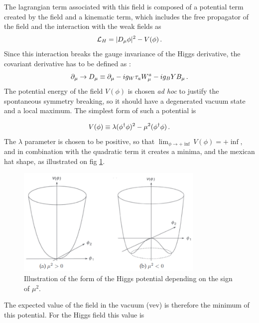 The lagrangian term associated with this field is composed of a potential term created by the field and a kinematic term, which includes the free propagator of the field and the interaction with the weak fields as 
\begin{equation}
    \Lagr_H = | D_{\mu}\phi |^2 - V(\phi) \mend
    \label{eq:higgs_lagr}
\end{equation}
Since this interaction breaks the gauge invariance of the Higgs derivative, the covariant derivative has to be defined as :
\begin{equation}
    \partial_{\mu} \rightarrow D_{\mu} \equiv \partial_{\mu} -ig_W \tau_a W_{\mu}^a - ig_B Y B_{\mu} \mend
\end{equation}
The potential energy of the field $V(\phi)$ is chosen \textit{ad hoc} to justify the spontaneous symmetry breaking, so it should have a degenerated vacuum state and a local maximum. The simplest form of such a potential is

\begin{equation}
    V(\phi) \equiv \lambda(\phi^{\dagger}\phi)^2 - \mu^2 (\phi^{\dagger}\phi) \mend
\end{equation}
The $\lambda$ parameter is chosen to be positive, so that $\lim_{\phi \to + \inf} V(\phi) = + \inf$, and in combination with the quadratic term it creates a minima, and the mexican hat shape, as illustrated on fig \ref{fig:mexicanhat}.

\begin{figure}
    \centering
    \includegraphics[width=0.8\textwidth]{Images/higgs_potential.png}
    \caption{Illustration of the form of the Higgs potential depending on the sign of $\mu^2$.}
    \label{fig:mexicanhat}
\end{figure}

The expected value of the field in the vacuum (vev) is therefore the minimum of this potential. For the Higgs field this value is

